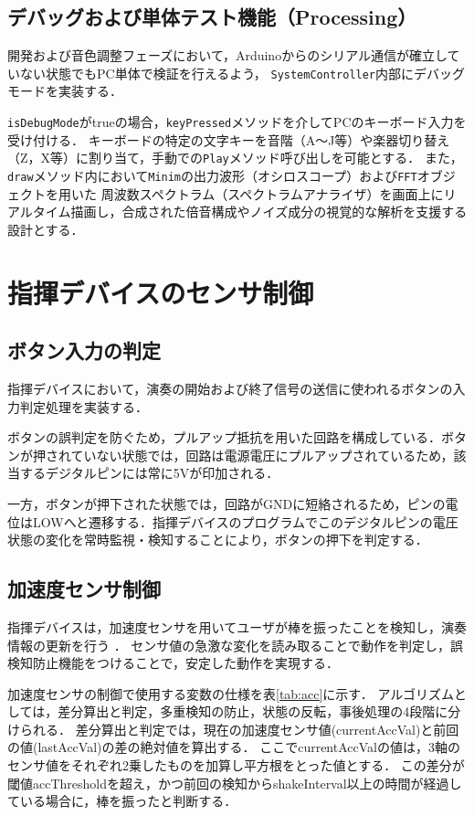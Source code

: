 \documentclass[lualatex,book,paper=a4paper,jafontsize=11.5pt,jafontscale=1.05]{jlreq}
\begin{document}
\subsection{デバッグおよび単体テスト機能（Processing）}

開発および音色調整フェーズにおいて，Arduinoからのシリアル通信が確立していない状態でもPC単体で検証を行えるよう，
\texttt{SystemController}内部にデバッグモードを実装する．

\texttt{isDebugMode}がtrueの場合，\texttt{keyPressed}メソッドを介してPCのキーボード入力を受け付ける．
キーボードの特定の文字キーを音階（A〜J等）や楽器切り替え（Z，X等）に割り当て，手動での\texttt{Play}メソッド呼び出しを可能とする．
また，\texttt{draw}メソッド内において\texttt{Minim}の出力波形（オシロスコープ）および\texttt{FFT}オブジェクトを用いた
周波数スペクトラム（スペクトラムアナライザ）を画面上にリアルタイム描画し，合成された倍音構成やノイズ成分の視覚的な解析を支援する設計とする．
\section{指揮デバイスのセンサ制御}
\subsection{ボタン入力の判定}
指揮デバイスにおいて，演奏の開始および終了信号の送信に使われるボタンの入力判定処理を実装する．

ボタンの誤判定を防ぐため，プルアップ抵抗を用いた回路を構成している．ボタンが押されていない状態では，回路は電源電圧にプルアップされているため，該当するデジタルピンには常に5Vが印加される．

一方，ボタンが押下された状態では，回路がGNDに短絡されるため，ピンの電位はLOWへと遷移する．指揮デバイスのプログラムでこのデジタルピンの電圧状態の変化を常時監視・検知することにより，ボタンの押下を判定する．
\subsection{加速度センサ制御}
指揮デバイスは，加速度センサを用いてユーザが棒を振ったことを検知し，演奏情報の更新を行う
．
センサ値の急激な変化を読み取ることで動作を判定し，誤検知防止機能をつけることで，安定した動作を実現する．

加速度センサの制御で使用する変数の仕様を表\ref{tab:acc}に示す．
アルゴリズムとしては，差分算出と判定，多重検知の防止，状態の反転，事後処理の4段階に分けられる．
差分算出と判定では，現在の加速度センサ値(currentAccVal)と前回の値(lastAccVal)の差の絶対値を算出する．
ここでcurrentAccValの値は，3軸のセンサ値をそれぞれ2乗したものを加算し平方根をとった値とする．
この差分が閾値accThresholdを超え，かつ前回の検知からshakeInterval以上の時間が経過している場合に，棒を振ったと判断する．
\end{document}
